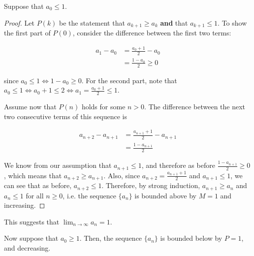 Suppose that $a_0 \leq 1$.
\begin{proof}
  Let $P(k)$ be the statement that $a_{k + 1} \geq a_k$ \textbf{and} that $a_{k + 1} \leq 1$. To show the first part of $P(0)$, consider the difference between the first two terms:

  \begin{align*}
    a_1 - a_0 &= \frac{a_0 + 1}{2} - a_0 \\
    &= \frac{1 - a_0}{2} \geq 0
  \end{align*}

  since $a_0 \leq 1 \iff 1 - a_0 \geq 0$. For the second part, note that $a_0 \leq 1 \iff a_0 + 1 \leq 2 \iff a_1 = \frac{a_0 + 1}{2} \leq 1$.

  Assume now that $P(n)$ holds for some $n > 0$. The difference between the next two consecutive terms of this sequence is

  \begin{align*}
    a_{n + 2} - a_{n + 1} &= \frac{a_{n + 1} + 1}{2} - a_{n + 1} \\
    &= \frac{1 - a_{n + 1}}{2}
  \end{align*}

  We know from our assumption that $a_{n + 1} \leq 1$, and therefore as before $\frac{1 - a_{n + 1}}{2} \geq 0$, which means that $a_{n + 2} \geq a_{n + 1}$. Also, since $a_{n + 2} = \frac{a_{n + 1} + 1}{2}$ and $a_{n + 1} \leq 1$, we can see that as before, $a_{n + 2} \leq 1$. Therefore, by strong induction, $a_{n + 1} \geq a_n$ and $a_n \leq 1$ for all $n \geq 0$, i.e. the sequence $\{a_n\}$ is bounded above by $M = 1$ and increasing.
\end{proof}

This suggests that $\lim_{n \rightarrow \infty} a_n = 1$.

Now suppose that $a_0 \geq 1$. Then, the sequence $\{a_n\}$ is bounded below by $P = 1$, and decreasing.

